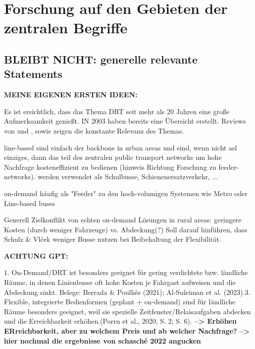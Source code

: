 \section{Forschung auf den Gebieten der zentralen Begriffe}
\label{sec:2.1}
\label{sec:Kontext}

\subsection{ BLEIBT NICHT: generelle relevante Statements}
\textbf{ MEINE EIGENEN ERSTEN IDEEN:}

Es ist ersichtlich, dass das Thema DRT seit mehr als 20 Jahren eine große Aufmerksamkeit genießt. IN 2003 haben \textcite{mageean_evaluation_2003} bereits eine Übersicht erstellt. Reviews von \textcite{davison_survey_2014} und \textcite{schasche_dilemma_2022}, sowie \textcite{vansteenwegen_survey_2022} zeigen die konstante Relevanz des Themas.



line-based sind einfach der backbone in urban areas und sind, wenn nicht asl einziges, dann das teil des zentralen public transport networks um hohe Nachfrage kosteneffizient zu bedienen (hinweis Richtung Forschung zu feeder-networks). werden verwendet als Schulbusse, Schienenersatzverkehr, ...

on-demand häufig als "Feeder" zu den hoch-volumigen Systemen wie Metro oder Line-based buses

Generell Zielkonflikt von echten on-demand Lösungen in rural areas: geringere Kosten (durch weniger Fahrzeuge) vs. Abdeckung(?) Soll darauf hinführen, dass Schulz \& Vlćek weniger Busse nutzen bei Beibehaltung der Flexibilität.

\textbf{ACHTUNG GPT:}


1. On-Demand/DRT ist besonders geeignet für gering verdichtete bzw. ländliche Räume, in denen Linienbusse oft hohe Kosten je Fahrgast aufweisen und die Abdeckung sinkt. Belege: Berrada \& Poulhès (2021); Al-Suleiman et al. (2023).3. Flexible, integrierte Bedienformen (geplant + on-demand) sind für ländliche Räume besonders geeignet, weil sie spezielle Zeitfenster/Relaisaufgaben abdecken und die Erreichbarkeit erhöhen.(Porru et al., 2020, S. 2; S. 6).
\textbf{--> Erhöhen ERreichbarkeit, aber zu welchem Preis und ab welcher Nachfrage?}
\textbf{--> hier nochmal die ergebnisse von schasché 2022 angucken}

